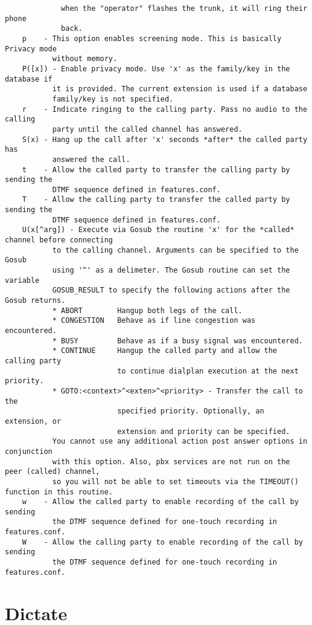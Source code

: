 \begin{verbatim}
             when the "operator" flashes the trunk, it will ring their phone
             back.
    p    - This option enables screening mode. This is basically Privacy mode
           without memory.
    P([x]) - Enable privacy mode. Use 'x' as the family/key in the database if
           it is provided. The current extension is used if a database
           family/key is not specified.
    r    - Indicate ringing to the calling party. Pass no audio to the calling
           party until the called channel has answered.
    S(x) - Hang up the call after 'x' seconds *after* the called party has
           answered the call.
    t    - Allow the called party to transfer the calling party by sending the
           DTMF sequence defined in features.conf.
    T    - Allow the calling party to transfer the called party by sending the
           DTMF sequence defined in features.conf.
    U(x[^arg]) - Execute via Gosub the routine 'x' for the *called* channel before connecting
           to the calling channel. Arguments can be specified to the Gosub
           using '^' as a delimeter. The Gosub routine can set the variable
           GOSUB_RESULT to specify the following actions after the Gosub returns.
           * ABORT        Hangup both legs of the call.
           * CONGESTION   Behave as if line congestion was encountered.
           * BUSY         Behave as if a busy signal was encountered.
           * CONTINUE     Hangup the called party and allow the calling party
                          to continue dialplan execution at the next priority.
           * GOTO:<context>^<exten>^<priority> - Transfer the call to the
                          specified priority. Optionally, an extension, or
                          extension and priority can be specified.
           You cannot use any additional action post answer options in conjunction
           with this option. Also, pbx services are not run on the peer (called) channel,
           so you will not be able to set timeouts via the TIMEOUT() function in this routine.
    w    - Allow the called party to enable recording of the call by sending
           the DTMF sequence defined for one-touch recording in features.conf.
    W    - Allow the calling party to enable recording of the call by sending
           the DTMF sequence defined for one-touch recording in features.conf.

\end{verbatim}


\section{Dictate}
